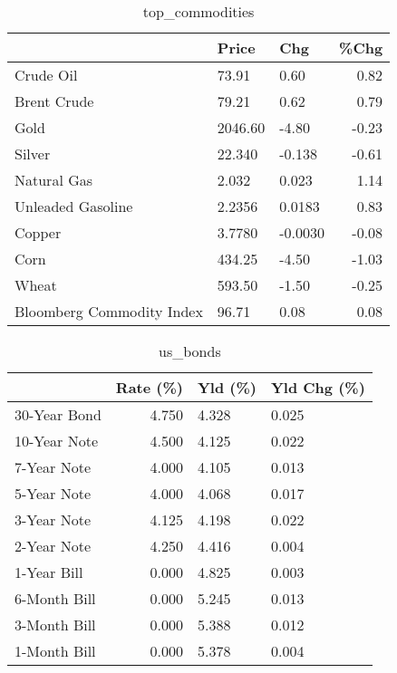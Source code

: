 \documentclass{article}%
\begin{document}
\begin{table}[htbp]%
\caption{top\_commodities}%
\centering%
\begin{adjustbox}{width=1\textwidth}%
\begin{tabular}{lllr}
\toprule
                          &   Price &     Chg &  \%Chg \\
\midrule
               Crude Oil  &   73.91 &    0.60 &  0.82 \\
             Brent Crude  &   79.21 &    0.62 &  0.79 \\
                    Gold  & 2046.60 &   -4.80 & -0.23 \\
                  Silver  &  22.340 &  -0.138 & -0.61 \\
             Natural Gas  &   2.032 &   0.023 &  1.14 \\
       Unleaded Gasoline  &  2.2356 &  0.0183 &  0.83 \\
                  Copper  &  3.7780 & -0.0030 & -0.08 \\
                    Corn  &  434.25 &   -4.50 & -1.03 \\
                   Wheat  &  593.50 &   -1.50 & -0.25 \\
Bloomberg Commodity Index &   96.71 &    0.08 &  0.08 \\
\bottomrule
\end{tabular}
%
\end{adjustbox}%
\end{table}

%


\begin{table}[htbp]%
\caption{us\_bonds}%
\centering%
\begin{adjustbox}{width=1\textwidth}%
\begin{tabular}{lrll}
\toprule
             &  Rate (\%) & Yld (\%) & Yld Chg (\%) \\
\midrule
30-Year Bond &     4.750 &   4.328 &       0.025 \\
10-Year Note &     4.500 &   4.125 &       0.022 \\
 7-Year Note &     4.000 &   4.105 &       0.013 \\
 5-Year Note &     4.000 &   4.068 &       0.017 \\
 3-Year Note &     4.125 &   4.198 &       0.022 \\
 2-Year Note &     4.250 &   4.416 &       0.004 \\
 1-Year Bill &     0.000 &   4.825 &       0.003 \\
6-Month Bill &     0.000 &   5.245 &       0.013 \\
3-Month Bill &     0.000 &   5.388 &       0.012 \\
1-Month Bill &     0.000 &   5.378 &       0.004 \\
\bottomrule
\end{tabular}
%
\end{adjustbox}%
\end{table}
\end{document}
